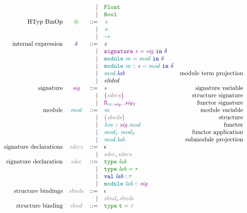 \documentclass[12pt,fleqn]{article}
\newcommand{\green}[1]{\textcolor{green}{#1}}
\newcommand{\blue}[1]{\textcolor{blue}{#1}}
\newcommand{\purple}[1]{\textcolor{purple}{#1}}
\newcommand{\teal}[1]{\textcolor{teal}{#1}}
\newcommand{\grey}[1]{\textcolor{grey}{#1}}
\newcommand{\greentt}[1]{\green{\mathtt{#1}}}
\newcommand{\bluett}[1]{\blue{\mathtt{#1}}}
\newcommand{\purplett}[1]{\purple{\mathtt{#1}}}
\newcommand{\tealtt}[1]{\teal{\mathtt{#1}}}
\newcommand{\greenit}[1]{\green{\mathit{#1}}}
\newcommand{\blueit}[1]{\blue{\mathit{#1}}}
\newcommand{\purpleit}[1]{\purple{\mathit{#1}}}
\newcommand{\tealit}[1]{\teal{\mathit{#1}}}
\newcommand{\greyit}[1]{\grey{\mathit{#1}}}
\newcommand{\typ}[1][]{\greenit{\tau#1}}
\renewcommand{\exp}[1][]{\blueit{\delta#1}}
\newcommand{\expvar}[1][]{\blueit{x#1}}
\newcommand{\sig}[1][]{\purpleit{sig#1}}
\newcommand{\sigvar}[1][]{\purpleit{s#1}}
\renewcommand{\mod}[1][]{\tealit{mod#1}}
\newcommand{\modvar}[1][]{\tealit{m#1}}
\newcommand{\lab}[1][]{\mathit{lab#1}}
\newcommand{\Float}{\greentt{Float}}
\newcommand{\Bool}{\greentt{Bool}}
\newcommand{\Sig}[1]{\purplett{\{#1\}}}
\newcommand{\FunctorSig}[2]{\purplett{\Pi_{#1}.{#2}}}
\newcommand{\LetSig}[2]{\purplett{signature~#1=#2}\bluett{~in~\exp}}
\newcommand{\Struct}[1]{\tealtt{\{#1\}}}
\newcommand{\Functor}[2]{\tealtt{\lambda #1.#2}}
\newcommand{\FunctorAp}[2]{\tealtt{#1~#2}}
\newcommand{\SubModulePrj}[2]{\tealtt{#1.#2}}
\newcommand{\ModTermPrj}[2]{\bluett{#1.#2}}
\newcommand{\LetMod}[2]{\tealtt{module~#1=#2}\bluett{~in~\exp}}
\newcommand{\sbnd}{\greyit{sbnd}}
\newcommand{\sbnds}{\greyit{sbnds}}
\newcommand{\sdec}{\greyit{sdec}}
\newcommand{\sdecs}{\greyit{sdecs}}
\begin{document}
\[\begin{array}{rcrlr}
                       && \vert & \Float \\
                       && \vert & \Bool \\
    \textrm{HTyp BinOp} & \greenit{\oplus} & ::=
                   & \greentt{\times} \\
                   && \vert & \greentt{+} \\
                   && \vert & \greentt{\rightarrow}\\
    \textrm{internal expression} & \exp & ::=
                                 & \expvar \\
                                 && \vert & \LetSig{\sigvar}{\sig} \\
                                 && \vert & \LetMod{\modvar}{\mod} \\
                                 && \vert & \LetMod{\modvar :: \sigvar}{\mod} \\
                                 && \vert & \ModTermPrj{\mod}{\lab} & \textrm{module term projection} \\
                                 && \vert & \textit{elided} \\
    \textrm{signature} & \sig & ::=
                       & \sigvar & \textrm{signature variable} \\
                       && \vert & \Sig{\sdecs} & \textrm{structure signature} \\
                       && \vert & \FunctorSig{\modvar::\sig[_1]}{\sig[_2]} & \textrm{functor signature} \\
    \textrm{module} & \mod & ::=
                    & \modvar & \textrm{module variable} \\
                    && \vert & \Struct{\sbnds} & \textrm{structure} \\
                    && \vert & \Functor{\modvar::\sig}{\mod} & \textrm{functor} \\
                    && \vert & \FunctorAp{\mod[_1]}{\mod[_2]} & \textrm{functor application} \\
                    && \vert & \SubModulePrj{\mod}{\lab} & \textrm{submodule projection} \\
    \textrm{signature declarations} & \sdecs & ::=
                                & \epsilon \\
                                && \vert & \sdec,\sdecs\\
    \textrm{signature declaration} & \sdec & ::=
                                   & \greentt{type~\lab} \\
                                   && \vert & \greentt{type~\lab = \typ} \\
                                   && \vert & \bluett{val~\lab : \typ} \\
                                   && \vert & \tealtt{module~\lab :: \sig} \\
    \textrm{structure bindings} & \sbnds & ::=
                                & \epsilon \\
                                && \vert & \sbnd,\sbnds \\
    \textrm{structure binding} & \sbnd & ::=
                               & \greentt{type~t = \typ}
\end{array}\]
\end{document}
